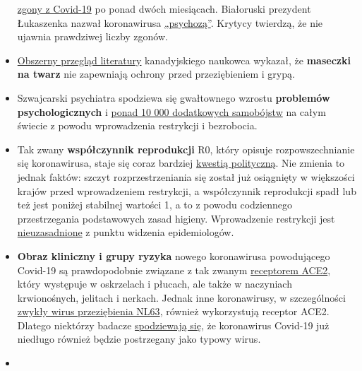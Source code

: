 \begin{itemize}
  \href{https://en.wikipedia.org/wiki/COVID-19_pandemic_in_Belarus}{zgony
  z Covid-19} po ponad dwóch miesiącach. Białoruski prezydent Łukaszenka
  nazwał koronawirusa
  \href{https://www.baltictimes.com/lukashenko__coronavirus_is_psychosis/}{„psychozą''}.
  Krytycy twierdzą, że nie ujawnia prawdziwej liczby zgonów.
\item
  \href{https://www.researchgate.net/publication/340570735_Masks_Don't_Work_A_review_of_science_relevant_to_COVID-19_social_policy}{Obszerny
  przegląd literatury} kanadyjskiego naukowca wykazał, że
  \textbf{maseczki na twarz} nie zapewniają ochrony przed przeziębieniem
  i grypą.
\item
  Szwajcarski psychiatra spodziewa się gwałtownego wzrostu
  \textbf{problemów psychologicznych} i
  \href{https://www.aargauerzeitung.ch/aargau/kanton-aargau/aargauer-psychiatrie-chefarzt-kawohl-warnt-arbeitslosigkeit-erhoeht-das-suizidrisiko-137742663}{ponad
  10 000 dodatkowych samobójstw} na całym świecie z powodu wprowadzenia
  restrykcji i bezrobocia.
\item
  Tak zwany \textbf{współczynnik reprodukcji} R0, który opisuje
  rozpowszechnianie się koronawirusa, staje się coraz bardziej
  \href{https://www.tagesschau.de/faktenfinder/corona-reproduktionszahl-101.html}{kwestią
  polityczną}. Nie zmienia to jednak faktów: szczyt rozprzestrzeniania
  się został już osiągnięty w większości krajów przed wprowadzeniem
  restrykcji, a współczynnik reprodukcji spadł lub też jest poniżej
  stabilnej wartości 1, a to z powodu codziennego przestrzegania
  podstawowych zasad higieny. Wprowadzenie restrykcji jest
  \href{https://infekt.ch/2020/04/sind-wir-tatsaechlich-im-blindflug/}{nieuzasadnione}
  z punktu widzenia epidemiologów.
\item
  \textbf{Obraz kliniczny i grupy ryzyka} nowego koronawirusa
  powodującego Covid-19 są prawdopodobnie związane z tak zwanym
  \href{https://www.news-medical.net/news/20200420/ACE2-TMPRSS2-profiling-indicates-tissue-vulnerability-to-SARS-CoV-2-infection.aspx}{receptorem
  ACE2}, który występuje w oskrzelach i płucach, ale także w naczyniach
  krwionośnych, jelitach i nerkach. Jednak inne koronawirusy, w
  szczególności
  \href{https://www.ncbi.nlm.nih.gov/pmc/articles/PMC4369385/}{zwykły
  wirus przeziębienia NL63}, również wykorzystują receptor ACE2. Dlatego
  niektórzy badacze
  \href{https://www.ncbi.nlm.nih.gov/pmc/articles/PMC7074995/}{spodziewają
  się}, że koronawirus Covid-19 już niedługo również będzie postrzegany
  jako typowy wirus.
\item

\end{itemize}
